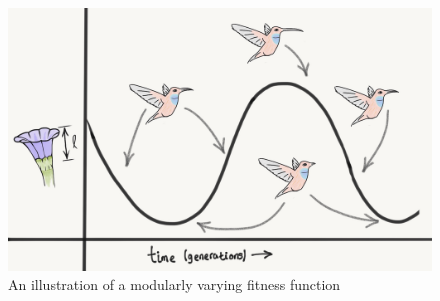 \begin{figure}
  \includegraphics[width=\textwidth]{img/varying_fitness_function}
  \captionsetup{singlelinecheck=off,justification=raggedright}
  \caption{An illustration of a modularly varying fitness function \cite{Kashtan2005SpontaneousMotifs}}
  \label{fig:hummingbird_selection_pressure}
\end{figure}